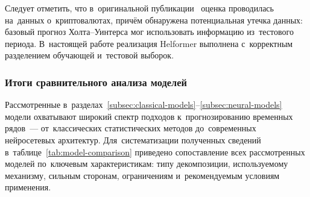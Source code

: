 Следует отметить, что в~оригинальной публикации~\cite{kehinde2025helformer}
оценка проводилась на~данных о~криптовалютах, причём обнаружена
потенциальная утечка данных: базовый прогноз Холта--Уинтерса мог
использовать информацию из~тестового периода.  В~настоящей работе
реализация Helformer выполнена с~корректным разделением обучающей
и~тестовой выборок.


\subsubsection{Итоги сравнительного анализа моделей}
\label{sssec:model-comparison-summary}

Рассмотренные в~разделах~\ref{subsec:classical-models}--\ref{subsec:neural-models}
модели охватывают широкий спектр подходов к~прогнозированию временных
рядов~--- от~классических статистических методов до~современных нейросетевых
архитектур.  Для~систематизации полученных сведений в~таблице~\ref{tab:model-comparison}
приведено сопоставление всех рассмотренных моделей по~ключевым характеристикам:
типу декомпозиции, используемому механизму, сильным сторонам, ограничениям
и~рекомендуемым условиям применения.


